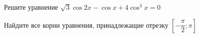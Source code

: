 \begin{ex}
	\begin{condition}
		\begin{enumcols}[label=\asbuk*)]
			\item Решите уравнение \( \sqrt{3}\cos 2x  - \cos x + 4\cos^3 x= 0 \)
			\item Найдите все корни уравнения, принадлежащие отрезку \( \left[-\dfrac{\pi}{2};\pi\right]  \)
		\end{enumcols}
	\end{condition}
\end{ex}